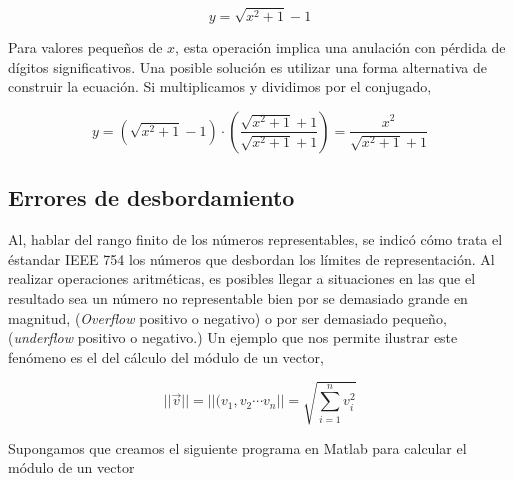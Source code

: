 \begin{equation*}
y=\sqrt{x^2+1}-1
\end{equation*}
\begin{paracol}{2}
Para valores pequeños de $x$, esta operación implica una anulación con pérdida de dígitos significativos. Una posible solución es utilizar una forma alternativa de construir la ecuación. Si multiplicamos y dividimos por el conjugado,
\end{paracol}
\begin{equation*}
y=(\sqrt{x^2+1}-1)\cdot\left(\frac{\sqrt{x^2+1}+1}{\sqrt{x^2+1}+1}\right)=\frac{x^2}{\sqrt{x^2+1}+1}
\end{equation*}

\begin{paracol}{2}
\subsection{Errores de desbordamiento}

Al, hablar del rango finito de los números representables, se indicó cómo trata el éstandar IEEE 754 los números que desbordan los límites de representación. Al realizar operaciones aritméticas, es posibles llegar a situaciones en las que el resultado sea un número no representable bien por se demasiado grande en magnitud, (\emph{Overflow} positivo o negativo) o por ser demasiado pequeño, (\emph{underflow} positivo o negativo.) Un ejemplo que nos permite ilustrar este fenómeno es el del cálculo del módulo de un vector,
\end{paracol}

\begin{equation*}
\vert\vert\vec{v}\vert\vert=\vert\vert(v_1, v_2\cdots v_n\vert\vert=\sqrt{\sum_{i=1}^nv_i^2}
\end{equation*}
\begin{paracol}{2}
Supongamos que creamos el siguiente programa en Matlab para calcular el módulo de un vector
\end{paracol}

